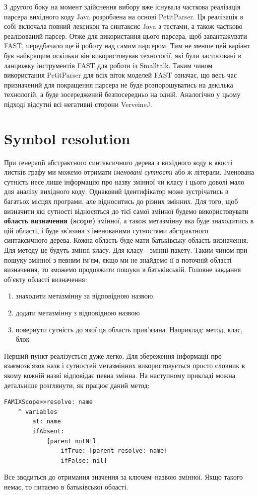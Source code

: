 \documentclass[12pt,a4paper]{article}
\begin{document}
З другого боку на момент здійснення вибору вже існувала часткова реалізація парсера вихідного коду Java розроблена на основі PetitParser. Ця реалізація в собі включала повний лексикон та синтаксис Java з тестами, а також частково реалізований парсер. Отже для використання цього парсера, щоб завантажувати FAST, передбачало ще й роботу над самим парсером. Тим не менше цей варіант був найкращим оскільки він використовував технології, які були застосовані в ланцюжку інструментів FAST для роботи із Smalltalk. Таким чином використання PetitParser для всіх віток моделей FAST означає, що весь час призначений для покращення парсера не буде розпорошуватись на декілька технологій, а буде зосереджений безпосередньо на одній. Аналогічно у цьому підході відсутні всі негативні сторони VerveineJ.

\clearpage

\section{Symbol resolution}
При генерації абстрактного синтаксичного дерева з вихідного коду в якості листків графу ми можемо отримати \emph{іменовані сутності} або ж літерали. Іменована сутність несе лише інформацію про назву змінної чи класу і цього доволі мало для аналізу вихідного коду. Однаковий ідентифікатор може зустрічатись в багатьох місцях програми, але відноситись до різних змінних. Для того, щоб визначити які сутності відносяться до тієї самої змінної будемо використовувати \textbf{область визначення (scope)} змінної, а також метазмінну яка буде знаходитись в цій області, і буде зв'язана з іменованими сутностями абстрактного синтаксичного дерева. Кожна область буде мати батьківську область визначення. Для методу це будуть змінні класу. Для класу - змінні пакету. Таким чином при пошуку змінної з певним ім'ям, якщо ми не знайдемо її в поточній області визначення, то зможемо продовжити пошуки в батьківській. Головне завдання об'єкту області визначення:
\begin{enumerate}
\item знаходити метазмінну за відповідною назвою.
\item додати метазмінну з відповідною назвою
\item повернути сутність до якої ця область прив'язана. Наприклад: метод, клас, блок
\end{enumerate}

Перший пункт реалізується дуже легко. Для збереження інформації про взаємозв'язок назв і сутностей метазмінних використовується просто словник в якому кожній назві відповідає певна змінна. На наступному прикладі можна детальніше розглянути, як працює даний метод:
\begin{lstlisting}[language=Smalltalk]
FAMIXScope>>resolve: name
	^ variables
		at: name
		ifAbsent: 
			[parent notNil 
				ifTrue: [parent resolve: name] 
				ifFalse: nil]
\end{lstlisting}
Все зводиться до отримання значення за ключем--назвою змінної. Якщо такого немає, то питаємо в батьківської області.
\end{document}
